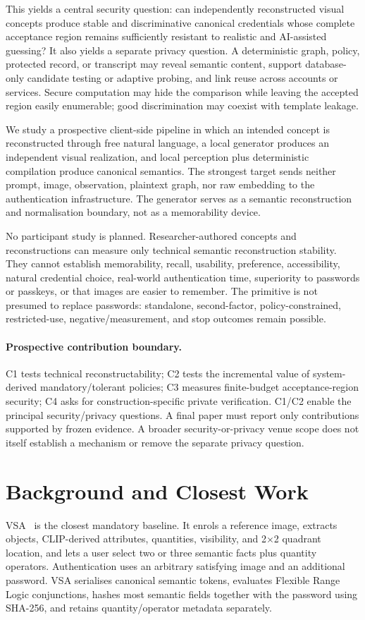 \documentclass[compsoc,conference,a4paper,10pt,times]{IEEEtran}
\begin{document}
This yields a central security question: can independently reconstructed visual concepts produce stable and discriminative canonical credentials whose complete acceptance region remains sufficiently resistant to realistic and AI-assisted guessing? It also yields a separate privacy question. A deterministic graph, policy, protected record, or transcript may reveal semantic content, support database-only candidate testing or adaptive probing, and link reuse across accounts or services. Secure computation may hide the comparison while leaving the accepted region easily enumerable; good discrimination may coexist with template leakage.

We study a prospective client-side pipeline in which an intended concept is reconstructed through free natural language, a local generator produces an independent visual realization, and local perception plus deterministic compilation produce canonical semantics. The strongest target sends neither prompt, image, observation, plaintext graph, nor raw embedding to the authentication infrastructure. The generator serves as a semantic reconstruction and normalisation boundary, not as a memorability device.

No participant study is planned. Researcher-authored concepts and reconstructions can measure only technical semantic reconstruction stability. They cannot establish memorability, recall, usability, preference, accessibility, natural credential choice, real-world authentication time, superiority to passwords or passkeys, or that images are easier to remember. The primitive is not presumed to replace passwords: standalone, second-factor, policy-constrained, restricted-use, negative/measurement, and stop outcomes remain possible.

\paragraph{Prospective contribution boundary.}
C1 tests technical reconstructability; C2 tests the incremental value of system-derived mandatory/tolerant policies; C3 measures finite-budget acceptance-region security; C4 asks for construction-specific private verification. C1/C2 enable the principal security/privacy questions. A final paper must report only contributions supported by frozen evidence. A broader security-or-privacy venue scope does not itself establish a mechanism or remove the separate privacy question.

\section{Background and Closest Work}
\label{sec:related}
VSA~\cite{Jeong2026VSA} is the closest mandatory baseline. It enrols a reference image, extracts objects, CLIP-derived attributes, quantities, visibility, and 2$\times$2 quadrant location, and lets a user select two or three semantic facts plus quantity operators. Authentication uses an arbitrary satisfying image and an additional password. VSA serialises canonical semantic tokens, evaluates Flexible Range Logic conjunctions, hashes most semantic fields together with the password using SHA-256, and retains quantity/operator metadata separately.
\end{document}
